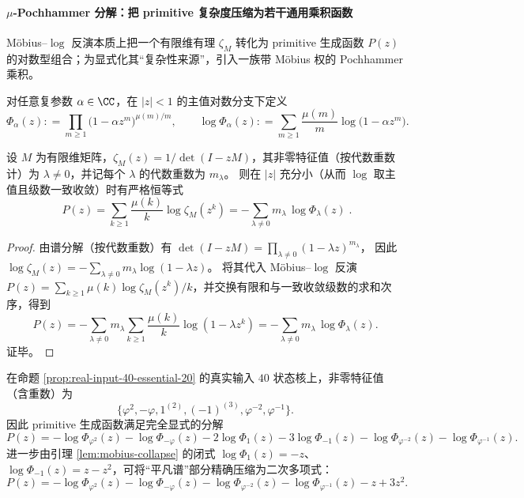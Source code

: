 \paragraph{\texorpdfstring{$\mu$}{mu}-Pochhammer 分解：把 primitive 复杂度压缩为若干通用乘积函数}
Möbius--$\log$ 反演本质上把一个有限维有理 \(\zeta_M\) 转化为 primitive 生成函数 \(P(z)\) 的对数型组合；为显式化其“复杂性来源”，引入一族带 Möbius 权的 Pochhammer 乘积。

\begin{definition}\label{def:mu-pochhammer}
对任意复参数 \(\alpha\in\CC\)，在 \(|z|<1\) 的主值对数分支下定义
\[
\Phi_\alpha(z)
:\!=\prod_{m\ge 1}\bigl(1-\alpha z^m\bigr)^{\mu(m)/m},
\qquad
\log\Phi_\alpha(z)
:\!=\sum_{m\ge 1}\frac{\mu(m)}{m}\log\bigl(1-\alpha z^m\bigr).
\]
\end{definition}

\begin{proposition}\label{prop:mu-pochhammer-decomposition}
设 \(M\) 为有限维矩阵，\(\zeta_M(z)=1/\det(I-zM)\)，其非零特征值（按代数重数计）为 \(\lambda\neq 0\)，并记每个 \(\lambda\) 的代数重数为 \(m_\lambda\)。
则在 \(|z|\) 充分小（从而 \(\log\) 取主值且级数一致收敛）时有严格恒等式
\[
\boxed{\;
P(z)
=\sum_{k\ge 1}\frac{\mu(k)}{k}\log\zeta_M(z^k)
=-\sum_{\lambda\neq 0}m_\lambda\,\log\Phi_\lambda(z)\; }.
\]
\end{proposition}
\begin{proof}
由谱分解（按代数重数）有
\(
\det(I-zM)=\prod_{\lambda\neq 0}(1-\lambda z)^{m_\lambda}
\)，
因此
\(
\log\zeta_M(z)
=-\sum_{\lambda\neq 0}m_\lambda\log(1-\lambda z)
\)。
将其代入 Möbius--$\log$ 反演
\(
P(z)=\sum_{k\ge 1}\mu(k)\log\zeta_M(z^k)/k
\)，并交换有限和与一致收敛级数的求和次序，得到
\[
P(z)
=-\sum_{\lambda\neq 0}m_\lambda\sum_{k\ge 1}\frac{\mu(k)}{k}\log(1-\lambda z^k)
=-\sum_{\lambda\neq 0}m_\lambda\,\log\Phi_\lambda(z).
\]
证毕。
\end{proof}

\begin{corollary}\label{cor:real-input-40-mu-pochhammer-explicit}
在命题 \ref{prop:real-input-40-essential-20} 的真实输入 \(40\) 状态核上，非零特征值（含重数）为
\[
\{\varphi^2,-\varphi,1^{(2)},(-1)^{(3)},\varphi^{-2},\varphi^{-1}\}.
\]
因此 primitive 生成函数满足完全显式的分解
\[
\boxed{
P(z)=
-\log\Phi_{\varphi^2}(z)
-\log\Phi_{-\varphi}(z)
-2\log\Phi_{1}(z)
-3\log\Phi_{-1}(z)
-\log\Phi_{\varphi^{-2}}(z)
-\log\Phi_{\varphi^{-1}}(z).
}
\]
进一步由引理 \ref{lem:mobius-collapse} 的闭式 \(\log\Phi_{1}(z)=-z\)、\(\log\Phi_{-1}(z)=z-z^2\)，可将“平凡谱”部分精确压缩为二次多项式：
\[
\boxed{
P(z)=
-\log\Phi_{\varphi^2}(z)
-\log\Phi_{-\varphi}(z)
-\log\Phi_{\varphi^{-2}}(z)
-\log\Phi_{\varphi^{-1}}(z)
-z+3z^2.
}
\]
\end{corollary}

